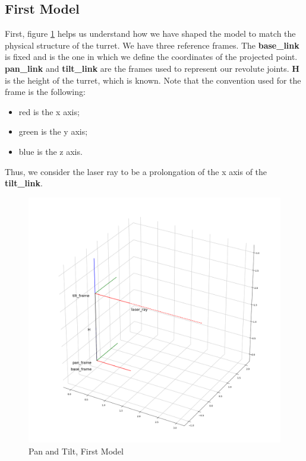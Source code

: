 \subsection{First Model}
First, figure \ref{fig:firstModel} helps us understand how we have shaped the model to match the physical structure of the turret. We have three reference frames. The \textbf{base\_link} is fixed and is the one in which we define the coordinates of the projected point. \textbf{pan\_link} and \textbf{tilt\_link} are the frames used to represent our revolute joints.
\textbf{H} is the height of the turret, which is known. Note that the convention used for the frame is the following:
\begin{itemize}
    \item red is the x axis;
    \item green is the y axis;
    \item blue is the z axis.
\end{itemize}
Thus, we consider the laser ray to be a prolongation of the x axis of the \textbf{tilt\_link}.
\begin{figure}
	\centering
	\includegraphics[width=\textwidth]{img/firstModel.png}%
	\caption{Pan and Tilt, First Model}
	\label{fig:firstModel}
\end{figure}

\\

